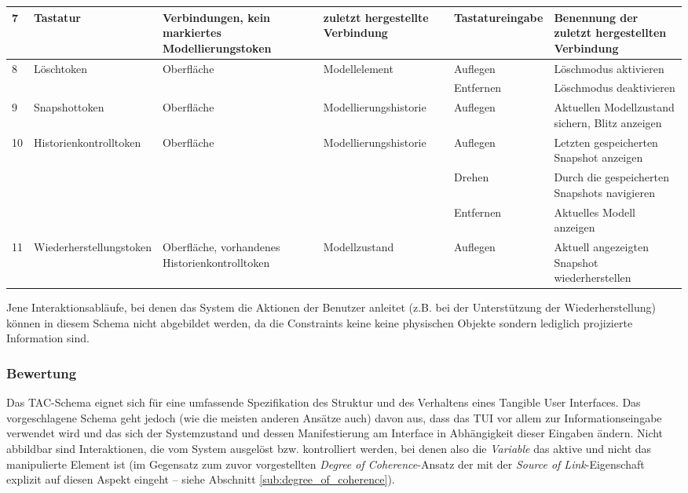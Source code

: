 \begin{longtable}{| p{0.8cm} || p{2.2cm} | p{2cm} || p{2cm} | p{2cm} | p{3cm} |}
		7 & Tastatur & Verbind\-ungen, kein markiertes Modell\-ierungs\-token & zuletzt hergestellte Verbindung & Tastatur\-eingabe & Benennung der zuletzt hergestellten Verbindung \\ \hline
		\multirow{2}{*}{8} & Lösch\-token & Oberfläche & Modell\-element & Auflegen & Löschmodus aktivieren \\ \cline{5-6}
		 				   &    	& 			 &  & Entfernen & Löschmodus deaktivieren \\ \hline
		9 & Snapshot\-token & Oberfläche & Modell\-ierungs\-historie & Auflegen & Aktuellen Modellzustand sichern, Blitz anzeigen \\ \hline
		\multirow{3}{*}{10} & Historien\-kontroll\-token & Oberfläche & Modell\-ierungs\-historie  & Auflegen & Letzten gespeicherten Snapshot anzeigen \\ \cline{5-6}
						   &   &			 &  & Drehen & Durch die gespeicherten Snapshots navigieren \\ \cline{5-6}
						   &   &			 &  & Entfernen & Aktuelles Modell anzeigen \\ \hline
		11 & Wieder\-herstellungs\-token & Oberfläche, vorhandenes Historien\-kontroll\-token & Modell\-zustand & Auflegen & Aktuell angezeigten Snapshot wiederherstellen \\ \hline

	\end{longtable}

Jene Interaktionsabläufe, bei denen das System die Aktionen der Benutzer anleitet (z.B. bei der Unterstützung der Wiederherstellung) können in diesem Schema nicht abgebildet werden, da die Constraints keine keine physischen Objekte sondern lediglich projizierte Information sind.

\subsubsection{Bewertung}

Das \gls{TAC}-Schema eignet sich für eine umfassende Spezifikation des Struktur und des Verhaltens eines Tangible User Interfaces. Das vorgeschlagene Schema geht jedoch (wie die meisten anderen Ansätze auch) davon aus, dass das \gls{TUI} vor allem zur Informationseingabe verwendet wird und das sich der Systemzustand und dessen Manifestierung am Interface in Abhängigkeit dieser Eingaben ändern. Nicht abbildbar sind Interaktionen, die vom System ausgelöst bzw. kontrolliert werden, bei denen also die \emph{Variable} das aktive und nicht das manipulierte Element ist (im Gegensatz zum zuvor vorgestellten \emph{Degree of Coherence}-Ansatz der mit der \emph{Source of Link}-Eigenschaft explizit auf diesen Aspekt eingeht -- siehe Abschnitt \ref{sub:degree_of_coherence}).

